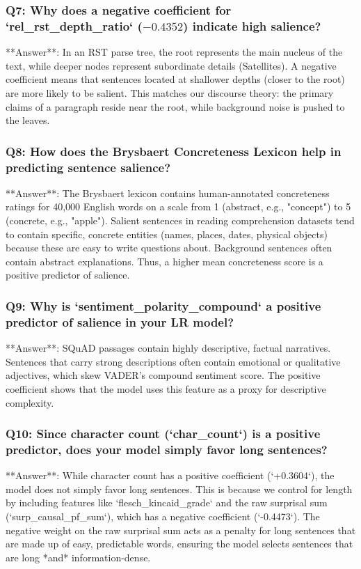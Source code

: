 \documentclass[11pt,a4paper]{article}
\begin{document}
\subsubsection{Q7: Why does a negative coefficient for `rel\_rst\_depth\_ratio` ($-0.4352$) indicate high salience?}
**Answer**: In an RST parse tree, the root represents the main nucleus of the text, while deeper nodes represent subordinate details (Satellites). A negative coefficient means that sentences located at shallower depths (closer to the root) are more likely to be salient. This matches our discourse theory: the primary claims of a paragraph reside near the root, while background noise is pushed to the leaves.

\subsubsection{Q8: How does the Brysbaert Concreteness Lexicon help in predicting sentence salience?}
**Answer**: The Brysbaert lexicon contains human-annotated concreteness ratings for 40,000 English words on a scale from 1 (abstract, e.g., "concept") to 5 (concrete, e.g., "apple"). 
Salient sentences in reading comprehension datasets tend to contain specific, concrete entities (names, places, dates, physical objects) because these are easy to write questions about. Background sentences often contain abstract explanations. Thus, a higher mean concreteness score is a positive predictor of salience.

\subsubsection{Q9: Why is `sentiment\_polarity\_compound` a positive predictor of salience in your LR model?}
**Answer**: SQuAD passages contain highly descriptive, factual narratives. Sentences that carry strong descriptions often contain emotional or qualitative adjectives, which skew VADER's compound sentiment score. The positive coefficient shows that the model uses this feature as a proxy for descriptive complexity.

\subsubsection{Q10: Since character count (`char\_count`) is a positive predictor, does your model simply favor long sentences?}
**Answer**: While character count has a positive coefficient (`+0.3604`), the model does not simply favor long sentences. This is because we control for length by including features like `flesch\_kincaid\_grade` and the raw surprisal sum (`surp\_causal\_pf\_sum`), which has a negative coefficient (`-0.4473`). The negative weight on the raw surprisal sum acts as a penalty for long sentences that are made up of easy, predictable words, ensuring the model selects sentences that are long *and* information-dense.
\end{document}
